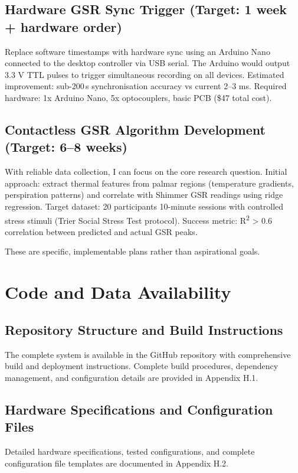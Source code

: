 \subsection{Hardware GSR Sync Trigger (Target: 1 week + hardware order)}
Replace software timestamps with hardware sync using an Arduino Nano connected to the desktop controller via USB serial. The Arduino would output 3.3 V TTL pulses to trigger simultaneous recording on all devices. Estimated improvement: sub-200\,\textmu s synchronisation accuracy vs current 2--3 ms. Required hardware: 1x Arduino Nano, 5x optocouplers, basic PCB (\$47 total cost).

\subsection{Contactless GSR Algorithm Development (Target: 6--8 weeks)}
With reliable data collection, I can focus on the core research question. Initial approach: extract thermal features from palmar regions (temperature gradients, perspiration patterns) and correlate with Shimmer GSR readings using ridge regression. Target dataset: 20 participants \texttimes{} 10-minute sessions with controlled stress stimuli (Trier Social Stress Test protocol). Success metric: R\textsuperscript{2} \textgreater{} 0.6 correlation between predicted and actual GSR peaks.

These are specific, implementable plans rather than aspirational goals.

\section{Code and Data Availability}

\subsection{Repository Structure and Build Instructions}
The complete system is available in the GitHub repository with comprehensive build and deployment instructions. Complete build procedures, dependency management, and configuration details are provided in Appendix H.1.

\subsection{Hardware Specifications and Configuration Files}
Detailed hardware specifications, tested configurations, and complete configuration file templates are documented in Appendix H.2.

